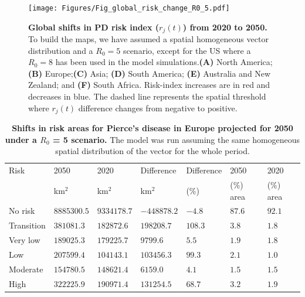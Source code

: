     \begin{figure}[t!]
        \centering

        \texttt{[image: Figures/Fig\_global\_risk\_change\_R0\_5.pdf]}
        \caption{\textbf{Global shifts in PD risk index ($r_j(t)$) from 2020 to
                2050.} To build the maps, we have assumed a spatial homogeneous
            vector
            distribution and a $R_0=5$ scenario, except for the US where a
            $R_0=8$ has been
            used in the model simulations.\textbf{(A)} North
            America;\textbf{(B)}
            Europe;\textbf{(C)} Asia; \textbf{(D)} South America; \textbf{(E)}
            Australia
            and New Zealand; and \textbf{(F)} South Africa. Risk-index
            increases are in red
            and decreases in blue. The dashed line represents the spatial
            threshold where
            $r_j(t)$ difference changes from negative to positive.}
        \label{fig5}
    \end{figure}

    \begin{table}[t!]
        \centering
        \caption{\textbf{Shifts in risk areas for Pierce's disease in Europe
                projected
                for 2050 under a $R_0$ = 5 scenario.} The model was run
            assuming the same
            homogeneous spatial distribution of the vector for the whole
            period.}
        \begin{tabular*}{\hsize}{@{\extracolsep{\fill}}lllllll}
            \hline
            Risk & 2050 & 2020 & Difference & Difference & 2050 & 2020 \\
            & km$^2$ & km$^2$ & km$^2$ & (\%) & (\%) area & (\%) area \\
            \hline
            No risk & $8885300.5$ & $9334178.7
            $ & $-448878.2
            $ & $-4.8
            $ & $87.6
            $ & $92.1
            $ \\
            Transition & $381081.3$
            & $182872.6$ & $198208.7$ & $108.3$ & $3.8$ & $1.8$ \\
            Very low & $189025.3$ & $179225.7
            $ & $9799.6$ & $5.5$ & $1.9$ & $1.8$ \\
            Low & $207599.4$ & $104143.1$ & $103456.3$ & $99.3$ & $2.1$ & $1.0$
            \\
            Moderate & $154780.5$ & $148621.4$ & $6159.0$ & $4.1$ & $1.5$ &
            $1.5$ \\
            High & $322225.9$ & $190971.4$ & $131254.5$ & $68.7$ & $3.2$ & $1.9
            $ \\
            \hline
        \end{tabular*}
        \label{table2}
    \end{table}

